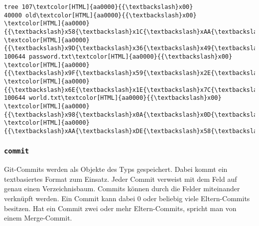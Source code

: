 \documentclass[
	nonacm,%
	screen,%
	sigplan,
]{acmart}
\begin{document}
\begin{example}
	\caption{Ein unkomprimiertes Objekt vom Typ }%
	\label{tree-example}%
	\centering
	\begin{Verbatim}[commandchars=\\\{\},fontsize=\small]
tree 107\textcolor[HTML]{aa0000}{{\textbackslash}x00}
40000 old\textcolor[HTML]{aa0000}{{\textbackslash}x00}
\textcolor[HTML]{aa0000}{{\textbackslash}x58{\textbackslash}x1C{\textbackslash}xAA{\textbackslash}x0F{\textbackslash}xE5{\textbackslash}x6C{\textbackslash}xF0{\textbackslash}x1D{\textbackslash}xC0{\textbackslash}x28{\textbackslash}xCC{\textbackslash}x0B{\textbackslash}x08}
\textcolor[HTML]{aa0000}{{\textbackslash}x9D{\textbackslash}x36{\textbackslash}x49{\textbackslash}x93{\textbackslash}xE0{\textbackslash}x46{\textbackslash}xB6}
100644 password.txt\textcolor[HTML]{aa0000}{{\textbackslash}x00}
\textcolor[HTML]{aa0000}{{\textbackslash}x9F{\textbackslash}x59{\textbackslash}x2E{\textbackslash}xB7{\textbackslash}xD5{\textbackslash}x8C{\textbackslash}xBF{\textbackslash}xD8{\textbackslash}x1F{\textbackslash}x80{\textbackslash}xBB{\textbackslash}x57{\textbackslash}x84}
\textcolor[HTML]{aa0000}{{\textbackslash}x6E{\textbackslash}x1E{\textbackslash}x7C{\textbackslash}x4C{\textbackslash}x2E{\textbackslash}x42{\textbackslash}x23}
100644 world.txt\textcolor[HTML]{aa0000}{{\textbackslash}x00}
\textcolor[HTML]{aa0000}{{\textbackslash}x98{\textbackslash}x0A{\textbackslash}x0D{\textbackslash}x5F{\textbackslash}x19{\textbackslash}xA6{\textbackslash}x4B{\textbackslash}x4B{\textbackslash}x30{\textbackslash}xA8{\textbackslash}x7D{\textbackslash}x42{\textbackslash}x06}
\textcolor[HTML]{aa0000}{{\textbackslash}xAA{\textbackslash}xDE{\textbackslash}x58{\textbackslash}x72{\textbackslash}x6B{\textbackslash}x60{\textbackslash}xE3}
	\end{Verbatim}
\end{example}

\subsubsection{\texttt{commit}}\label{commit}

Git-Commits werden als Objekte des Typs  gespeichert. Dabei kommt ein textbasiertes Format zum Einsatz. Jeder Commit verweist mit dem Feld  auf genau einen Verzeichnisbaum. Commits können durch die Felder  miteinander verknüpft werden. Ein Commit kann dabei 0 oder beliebig viele Eltern-Commits besitzen. Hat ein Commit zwei oder mehr Eltern-Commits, spricht man von einem Merge-Commit.
\end{document}
